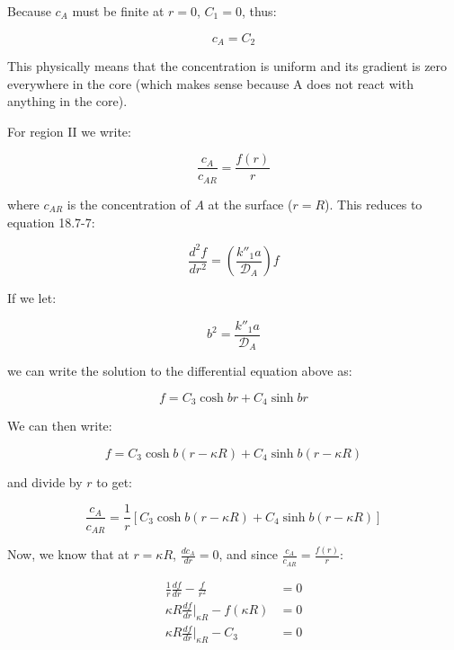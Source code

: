 \documentclass[letterpaper,12pt]{article}
\begin{document}
Because $c_A$ must be finite at $r = 0$, $C_1 = 0$, thus:

\begin{equation}
    c_A = C_2
\end{equation}

This physically means that the concentration is uniform and its gradient is zero everywhere in the core (which makes sense because A does not react with anything in the core).

For region II we write:

\begin{equation}
    \frac{c_A}{c_{AR}} = \frac{f(r)}{r}
\end{equation}

where $c_{AR}$ is the concentration of $A$ at the surface ($r = R$). This reduces to equation 18.7-7:

\begin{equation}
    \frac{d^2 f}{d r^2} = \left( \frac{k''_1 a}{\mathcal{D}_A} \right) f
\end{equation}

If we let:

\begin{equation}
    b^2 = \frac{k''_1 a}{\mathcal{D}_A}
\end{equation}

we can write the solution to the differential equation above as:

\begin{equation}
    f = C_3 \cosh{br} + C_4 \sinh{br}
\end{equation}

We can then write:

\begin{equation}
    f = C_3 \cosh{b(r - \kappa R)} + C_4 \sinh{b(r - \kappa R)}
\end{equation}

and divide by $r$ to get:

\begin{equation}
    \frac{c_A}{c_{AR}} = \frac{1}{r} \left[ C_3 \cosh{b(r - \kappa R)} + C_4 \sinh{b(r - \kappa R)} \right]
\end{equation}

Now, we know that at $r = \kappa R$, $\frac{d c_A}{d r} = 0$, and since $\frac{c_A}{c_{AR}} = \frac{f(r)}{r}$:

\begin{equation}
\begin{aligned}
    \frac{1}{r} \frac{df}{dr} - \frac{f}{r^2}             &= 0 \\
    \kappa R \frac{df}{dr} \bigg|_{\kappa R} - f(\kappa R) &= 0 \\
    \kappa R \frac{df}{dr} \bigg|_{\kappa R} - C_3 &= 0
\end{aligned}
\end{equation}
\end{document}
